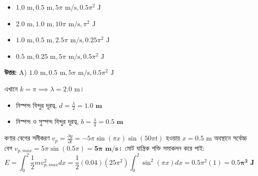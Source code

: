 \documentclass[12pt, a4paper]{article}
\begin{document}
\begin{itemize}[label={}, leftmargin=1cm, itemsep=0.5em]
    \item[\textbf{A)}] $1.0\text{ m}, 0.5\text{ m}, 5\pi\text{ m/s}, 0.5\pi^2\text{ J}$
    \item[\textbf{B)}] $2.0\text{ m}, 1.0\text{ m}, 10\pi\text{ m/s}, \pi^2\text{ J}$
    \item[\textbf{C)}] $1.0\text{ m}, 0.5\text{ m}, 2.5\pi\text{ m/s}, 0.25\pi^2\text{ J}$
    \item[\textbf{D)}] $0.5\text{ m}, 0.25\text{ m}, 5\pi\text{ m/s}, 0.5\pi^2\text{ J}$
\end{itemize}

\vspace{0.5em}
\begin{tcolorbox}[answerbox]
    \textbf{\color{success} উত্তর:} A) $1.0\text{ m}, 0.5\text{ m}, 5\pi\text{ m/s}, 0.5\pi^2\text{ J}$
\end{tcolorbox}
\vspace{1em}

\begin{tcolorbox}[solutionbox={সমাধান (Solution)}]
    \noindent
    এখানে $k = \pi \implies \lambda = 2.0\text{ m}$।
    \begin{itemize}[leftmargin=1.5em, itemsep=0.2em]
        \item নিস্পন্দ বিন্দুর দূরত্ব, $d = \frac{\lambda}{2} = \mathbf{1.0\text{ m}}$
        \item নিস্পন্দ ও সুস্পন্দ বিন্দুর দূরত্ব, $b = \frac{\lambda}{4} = \mathbf{0.5\text{ m}}$
    \end{itemize}
    কণার বেগের সমীকরণ $v_p = \frac{\partial y}{\partial t} = -5\pi \sin(\pi x) \sin(50\pi t)$ হওয়ায় $x = 0.5\text{ m}$ অবস্থানে সর্বোচ্চ বেগ $v_{p,max} = 5\pi \sin(0.5\pi) = \mathbf{5\pi\text{ m/s}}$। মোট যান্ত্রিক শক্তি সমাকলন করে পাই:
    \[ E = \int_0^2 \frac{1}{2} m v_{p,max}^2 dx = \frac{1}{2}(0.04)(25\pi^2) \int_0^2 \sin^2(\pi x) dx = 0.5\pi^2 (1) = \mathbf{0.5\pi^2\text{ J}} \]
\end{tcolorbox}

\vspace{2em}
\end{document}
